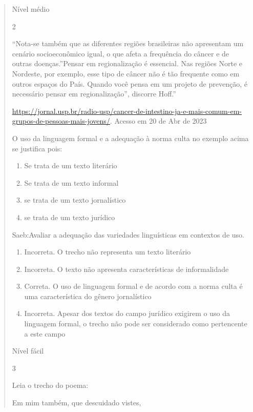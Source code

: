 {\begin{quote}
{\begin{itemize}
\begin{itemize}
Nível médio

\num{2}

``Nota-se também que as diferentes regiões brasileiras não apresentam um
cenário socioeconômico igual, o que afeta a frequência do câncer e de
outras doenças.''Pensar em regionalização é essencial. Nas regiões Norte
e Nordeste, por exemplo, esse tipo de câncer não é tão frequente como em
outros espaços do País. Quando você pensa em um projeto de prevenção, é
necessário pensar em regionalização'', discorre Hoff.''

\href{https://jornal.usp.br/radio-usp/cancer-de-intestino-ja-e-mais-comum-em-grupos-de-pessoas-mais-jovens/}{\uline{https://jornal.usp.br/radio-usp/cancer-de-intestino-ja-e-mais-comum-em-grupos-de-pessoas-mais-jovens/}}.
Acesso em 20 de Abr de 2023

O uso da linguagem formal e a adequação à norma culta no exemplo acima
se justifica pois:

\begin{enumerate}

\item
  Se trata de um texto literário
\item
  Se trata de um texto informal
\item
  se trata de um texto jornalístico
\item
  se trata de um texto jurídico
\end{enumerate}

Saeb:Avaliar a adequação das variedades linguísticas em contextos de
uso.

\begin{enumerate}
\def\labelenumi{\arabic{enumi}.}
\item
  Incorreta. O trecho não representa um texto literário
\item
  Incorreta. O texto não apresenta características de informalidade
\item
  Correta. O uso de linguagem formal e de acordo com a norma culta é uma
  característica do gênero jornalístico
\item
  Incorreta. Apesar dos textos do campo jurídico exigirem o uso da
  linguagem formal, o trecho não pode ser considerado como pertencente a
  este campo
\end{enumerate}

Nível fácil

\num{3}

Leia o trecho do poema:

Em mim também, que descuidado vistes,


\end{itemize}
\end{itemize}}
\end{quote}}

